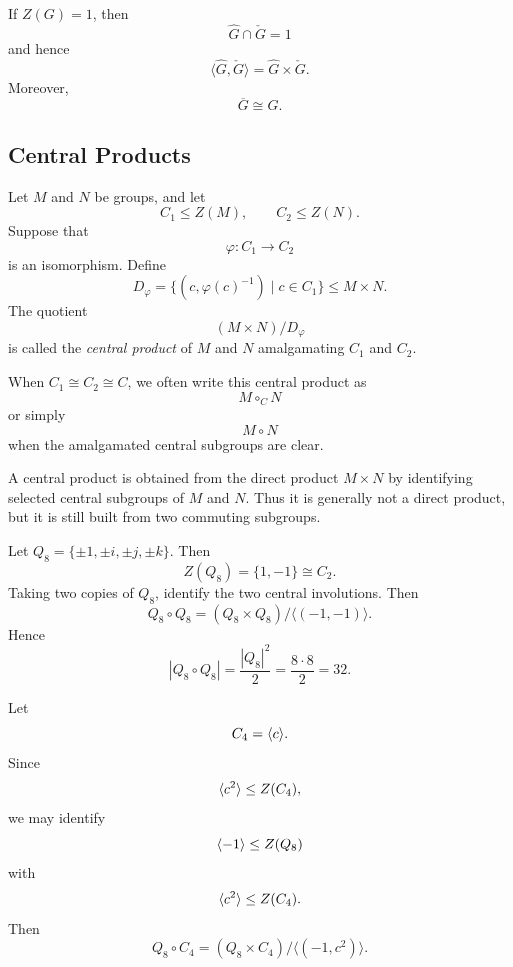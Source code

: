 \begin{corollary}
If \(Z(G)=1\), then
\[
    \widehat G\cap \check G=1
\]
and hence
\[
    \langle \widehat G,\check G\rangle
    =
    \widehat G\times \check G.
\]
Moreover,
\[
    \overline G\cong G.
\]
\end{corollary}

\subsection{Central Products}

\begin{definition}
Let \(M\) and \(N\) be groups, and let
\[
    C_1\leq Z(M),\qquad C_2\leq Z(N).
\]
Suppose that
\[
    \varphi:C_1\to C_2
\]
is an isomorphism. Define
\[
    D_\varphi=
    \{(c,\varphi(c)^{-1})\mid c\in C_1\}
    \leq M\times N.
\]
The quotient
\[
    (M\times N)/D_\varphi
\]
is called the \emph{central product} of \(M\) and \(N\) amalgamating \(C_1\) and \(C_2\).

When \(C_1\cong C_2\cong C\), we often write this central product as
\[
    M\circ_C N
\]
or simply
\[
    M\circ N
\]
when the amalgamated central subgroups are clear.
\end{definition}

\begin{remark}
A central product is obtained from the direct product \(M\times N\) by identifying selected
central subgroups of \(M\) and \(N\). Thus it is generally not a direct product, but it is still
built from two commuting subgroups.
\end{remark}

\begin{example}
Let \(Q_8=\{\pm1,\pm i,\pm j,\pm k\}\). Then
\[
    Z(Q_8)=\{1,-1\}\cong C_2.
\]
Taking two copies of \(Q_8\), identify the two central involutions. Then
\[
    Q_8\circ Q_8
    =
    (Q_8\times Q_8)/\langle(-1,-1)\rangle.
\]
Hence
\[
    |Q_8\circ Q_8|
    =
    \frac{|Q_8|^2}{2}
    =
    \frac{8\cdot 8}{2}
    =
    32.
\]
\end{example}

\begin{example}
Let
\[
    C_4=\langle c\rangle.
\]
Since
\[
    \langle c^2\rangle\leq Z(C_4),
\]
we may identify
\[
    \langle -1\rangle\leq Z(Q_8)
\]
with
\[
    \langle c^2\rangle\leq Z(C_4).
\]
Then
\[
    Q_8\circ C_4
    =
    (Q_8\times C_4)/\langle(-1,c^2)\rangle.
\]
\end{example}

